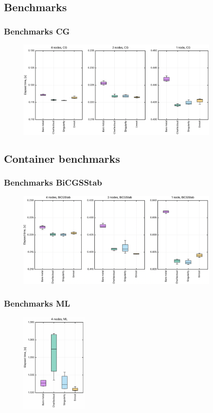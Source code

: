 \documentclass[hyperref={pdfpagelabels=false},aspectratio=169]{beamer}
\begin{document}
    \subsection{Benchmarks}
    \begin{frame}
    \frametitle{Benchmarks CG}
    \begin{figure}[H]
      \centering
       \includegraphics[width=0.9\textwidth]{images/cg.png}
      \label{fig:container_benchmarks}
    \end{figure}
    \end{frame}
    \subsection{Container benchmarks}
    \begin{frame}
    \frametitle{Benchmarks BiCGSStab}
    \begin{figure}[H]
      \centering
       \includegraphics[width=0.9\textwidth]{images/bicgstab.png}
      \label{fig:container_benchmarks}
    \end{figure}
    \end{frame}
    \begin{frame}
    \frametitle{Benchmarks ML}
    \begin{figure}[H]
      \centering
       \includegraphics[width=0.3\textwidth]{images/ml.png}
      \label{fig:container_benchmarks}
    \end{figure}
    \end{frame}
\end{document}
